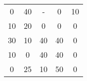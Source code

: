 \begin{tabular}{ccccc}
0      & 40     & -      & 0      & 10 \\
10     & 20     & 0      & 0      & 0 \\
30     & 10     & 40     & 40     & 0 \\
10     & 0      & 40     & 40     & 0 \\
0      & 25     & 10     & 50     & 0 \bigstrut[b]\\
\hline
\hline
\end{tabular}%
